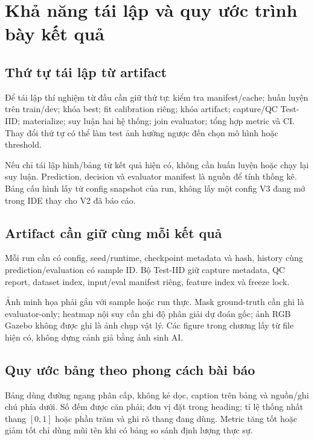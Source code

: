 \section{Khả năng tái lập và quy ước trình bày kết quả}
\label{sec:setup-reproducibility}

\subsection{Thứ tự tái lập từ artifact}

Để tái lập thí nghiệm từ đầu cần giữ thứ tự:
kiểm tra manifest/cache; huấn luyện trên train/dev;
khóa best; fit calibration riêng; khóa artifact;
capture/QC Test-IID; materialize; suy luận hai
hệ thống; join evaluator; tổng hợp metric và CI.
Thay đổi thứ tự có thể làm test ảnh hưởng ngược
đến chọn mô hình hoặc threshold.

Nếu chỉ tái lập hình/bảng từ kết quả hiện có,
không cần huấn luyện hoặc chạy lại suy luận.
Prediction, decision và evaluator manifest là
nguồn để tính thống kê. Bảng cấu hình lấy từ
config snapshot của run, không lấy một config
V3 đang mở trong IDE thay cho V2 đã báo cáo.

\subsection{Artifact cần giữ cùng mỗi kết quả}

{\setlength{\emergencystretch}{3em}
Mỗi run cần có config, seed/runtime, checkpoint
metadata và hash, history cùng prediction/evaluation
có sample ID. Bộ Test-IID giữ capture metadata,
QC report, dataset index, input/eval manifest
riêng, feature index và freeze lock.\par}


Ảnh minh họa phải gắn với sample hoặc run thực.
Mask ground-truth cần ghi là evaluator-only;
heatmap nội suy cần ghi độ phân giải dự đoán gốc;
ảnh RGB Gazebo không được ghi là ảnh chụp vật lý.
Các figure trong chương lấy từ file hiện có,
không dựng cảnh giả bằng ảnh sinh AI.

\subsection{Quy ước bảng theo phong cách bài báo}

Bảng dùng đường ngang phân cấp, không kẻ dọc,
caption trên bảng và nguồn/ghi chú phía dưới.
Số đếm được căn phải; đơn vị đặt trong heading;
tỉ lệ thống nhất thang $[0,1]$ hoặc phần trăm
và ghi rõ thang đang dùng. Metric tăng tốt hoặc
giảm tốt chỉ dùng mũi tên khi có bảng so sánh
định lượng thực sự.

